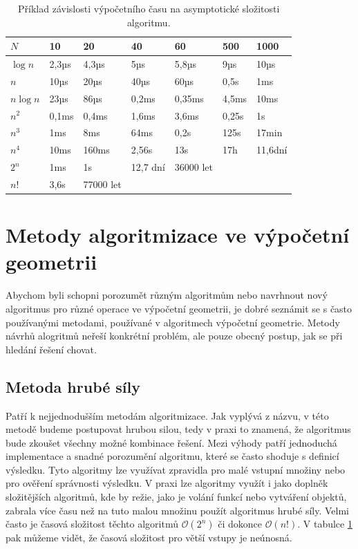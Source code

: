 	
\begin{table}

\begin{tabular}{ |p{1.4cm}||p{1.6cm}|p{1.6cm}|p{1.6cm}|p{1.6cm}|p{1.6cm}|p{1.6cm}|  }
\hline

$N$				&10			&20			&40			&60			&500		&1000\\
\hline
$\log n$		&2,3µs		&4,3µs		&5µs		&5,8µs		&9µs		&10µs\\			
$n$				&10µs		&20µs		&40µs		&60µs		&0,5s		&1ms\\
$n \log n$		&23µs		&86µs		&0,2ms		&0,35ms		&4,5ms		&10ms\\
$n^2$			&0,1ms		&0,4ms		&1,6ms		&3,6ms		&0,25s		&1s\\
$n^3$			&1ms		&8ms		&64ms		&0,2s		&125s		&17min\\
$n^4$			&10ms		&160ms		&2,56s		&13s		&17h		&11,6dní\\
$2^n$			&1ms		&1s			&12,7 dní	&36000 let	&			&\\
$n!$			&3,6s		&77000 let	&			&			&			&\\
\hline

\end{tabular}
\caption{Příklad závislosti výpočetního času na asymptotické složitosti algoritmu.}
\label{tab:4-time_complexity}
\end{table}

\section{Metody algoritmizace ve výpočetní geometrii}
	Abychom byli schopni porozumět různým algoritmům nebo navrhnout nový algoritmus pro různé operace ve výpočetní geometrii, je dobré seznámit se s často používanými metodami, používané v algoritmech výpočetní geometrie. Metody návrhů alogritmů neřeší konkrétní problém, ale pouze obecný postup, jak se při hledání řešení chovat.

\subsection{Metoda hrubé síly}
	Patří k nejjednodušším metodám algoritmizace. Jak vyplývá z názvu, v této metodě budeme postupovat hrubou silou, tedy v praxi to znamená, že algoritmus bude zkou\-šet všechny možné kombinace řešení. Mezi výhody patří jednoduchá implementace a snadné porozumění algoritmu, které se často shoduje s definicí výsledku. Tyto algoritmy lze využívat zpravidla pro malé vstupní množiny nebo pro ověření správnosti výsledku. V praxi lze algoritmy využít i jako doplněk složitějších algoritmů, kde by režie, jako je volání funkcí nebo vytváření objektů, zabrala více času než na tuto malou množinu použít algoritmus hrubé síly. Velmi často je časová složitost těchto algoritmů $\mathcal{O}(2^n)$ či dokonce $\mathcal{O}(n!)$. V tabulce \ref{tab:4-time_complexity} pak můžeme vidět, že časová složitost pro větší vstupy je neúnosná.
	
